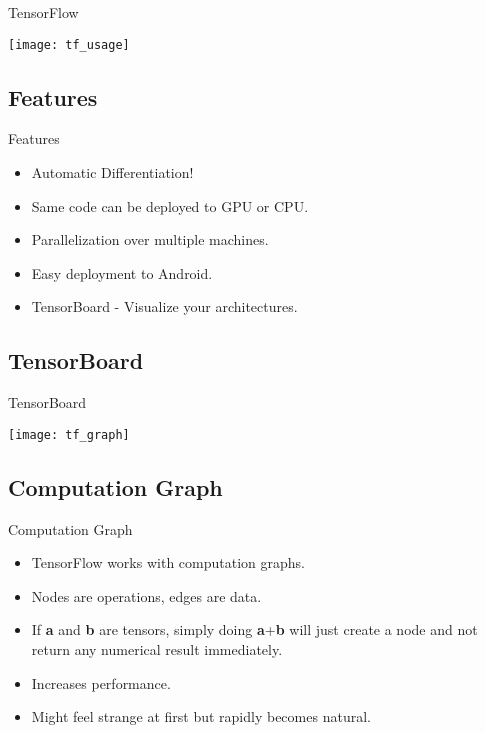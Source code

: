 \documentclass[xcolor=x11names,compress]{beamer}
\renewcommand{\(}{\begin{columns}}
\renewcommand{\)}{\end{columns}}
\newcommand{\<}[1]{\begin{column}{#1}}
\renewcommand{\>}{\end{column}}
\begin{document}
\begin{frame}{TensorFlow}
	\begin{center}
		\texttt{[image: tf\_usage]}
	\end{center}
\end{frame}

\subsection{Features}
\begin{frame}{Features}
	\begin{itemize}
		\item Automatic Differentiation!
		\item Same code can be deployed to GPU or CPU.
		\item Parallelization over multiple machines.
		\item Easy deployment to Android.
		\item TensorBoard - Visualize your architectures.
	\end{itemize}
\end{frame}


\subsection{TensorBoard}
\begin{frame}{TensorBoard}
	\begin{center}
		\texttt{[image: tf\_graph]}
	\end{center}
\end{frame}

\subsection{Computation Graph}
\begin{frame}{Computation Graph}
	\begin{itemize}
		\item TensorFlow works with computation graphs.
		\item Nodes are operations, edges are data.
		\item If \textbf{a} and \textbf{b} are tensors, simply doing \textbf{a}+\textbf{b} will just create a node and not return any numerical result immediately.
		\item Increases performance.
		\item Might feel strange at first but rapidly becomes natural.
	\end{itemize}
\end{frame}
\end{document}
